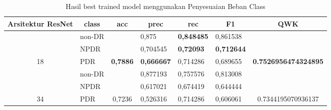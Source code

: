 \begin{table}[hbtp]
	\begin{center}
		\caption{Hasil best trained model menggunakan Penyesuaian Beban Class}
		\label{tb:HasilTrainClassWeight}
		\begin{tabular}{|c|l|c|l|l|l|c|}
			\hline
			\rowcolor[HTML]{C0C0C0} 
			Arsitektur ResNet   & \multicolumn{1}{c|}{\cellcolor[HTML]{C0C0C0}class} & acc                      & \multicolumn{1}{c|}{\cellcolor[HTML]{C0C0C0}prec} & \multicolumn{1}{c|}{\cellcolor[HTML]{C0C0C0}rec} & \multicolumn{1}{c|}{\cellcolor[HTML]{C0C0C0}F1} & QWK                                  \\ \hline
			& non-DR                                             &                          & 0,875                                             & \textbf{0,848485}                                & 0,861538                                        &                                      \\ \cline{2-2} \cline{4-6}
			& NPDR                                               &                          & 0,704545                                          & \textbf{0,72093}                                 & \textbf{0,712644}                               &                                      \\ \cline{2-2} \cline{4-6}
			\multirow{-3}{*}{18}  & PDR                                                & \multirow{-3}{*}{\textbf{0,7886}} & \textbf{0,666667}                        & 0,714286                                         & 0,689655                                        & \multirow{-3}{*}{\textbf{0.7526956474324895}} \\ \hline
			& non-DR                                             &                          & 0,877193                                          & 0,757576                                         & 0,813008                                        &                                      \\ \cline{2-2} \cline{4-6}
			& NPDR                                               &                          & 0,617021                                          & 0,674419                                         & 0,644444                                        &                                      \\ \cline{2-2} \cline{4-6}
			\multirow{-3}{*}{34}  & PDR                                                & \multirow{-3}{*}{0,7236} & 0,526316                                          & 0,714286                                         & 0,606061                                        & \multirow{-3}{*}{0.7344195070936137} \\ \hline

\end{tabular}
\end{center}
\end{table}
